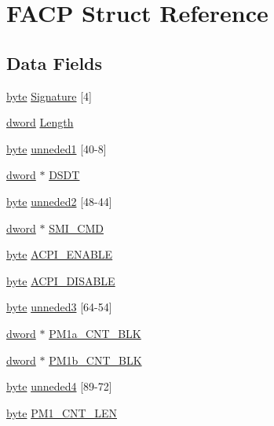 \hypertarget{structFACP}{}\section{F\+A\+CP Struct Reference}
\label{structFACP}
\subsection*{Data Fields}
\begin{DoxyCompactItemize}
\item 
\hyperlink{acpi_8c_a0c8186d9b9b7880309c27230bbb5e69d}{byte} \hyperlink{structFACP_a3ec5cc094770cdaf54942c95b5a4eae3}{Signature} \mbox{[}4\mbox{]}
\item 
\hyperlink{acpi_8c_a74cb93d430006e784da73b8ca406ee6e}{dword} \hyperlink{structFACP_ad27e676e94e75e3d8140a2a8c9fd6bfd}{Length}
\item 
\hyperlink{acpi_8c_a0c8186d9b9b7880309c27230bbb5e69d}{byte} \hyperlink{structFACP_ae5f7c21401a9d170e5c6a3caaa9b74ba}{unneded1} \mbox{[}40-\/8\mbox{]}
\item 
\hyperlink{acpi_8c_a74cb93d430006e784da73b8ca406ee6e}{dword} $\ast$ \hyperlink{structFACP_ae9d89be6ba26f7c9109d901c2daa3a75}{D\+S\+DT}
\item 
\hyperlink{acpi_8c_a0c8186d9b9b7880309c27230bbb5e69d}{byte} \hyperlink{structFACP_a6926f57eda7c9c85a3f7509b1d3080c6}{unneded2} \mbox{[}48-\/44\mbox{]}
\item 
\hyperlink{acpi_8c_a74cb93d430006e784da73b8ca406ee6e}{dword} $\ast$ \hyperlink{structFACP_a1ec5f1557834030b62601ecbf75eae9c}{S\+M\+I\+\_\+\+C\+MD}
\item 
\hyperlink{acpi_8c_a0c8186d9b9b7880309c27230bbb5e69d}{byte} \hyperlink{structFACP_a0ce6f514986cb7577fd80249528d4bf0}{A\+C\+P\+I\+\_\+\+E\+N\+A\+B\+LE}
\item 
\hyperlink{acpi_8c_a0c8186d9b9b7880309c27230bbb5e69d}{byte} \hyperlink{structFACP_ac7a25cb3b147fd2824eee9c6fe06f2e3}{A\+C\+P\+I\+\_\+\+D\+I\+S\+A\+B\+LE}
\item 
\hyperlink{acpi_8c_a0c8186d9b9b7880309c27230bbb5e69d}{byte} \hyperlink{structFACP_aa83604b4fb4ca7634fc6da593f8a9d10}{unneded3} \mbox{[}64-\/54\mbox{]}
\item 
\hyperlink{acpi_8c_a74cb93d430006e784da73b8ca406ee6e}{dword} $\ast$ \hyperlink{structFACP_a60341d35abc5ca9a85e97ec88f2afa0c}{P\+M1a\+\_\+\+C\+N\+T\+\_\+\+B\+LK}
\item 
\hyperlink{acpi_8c_a74cb93d430006e784da73b8ca406ee6e}{dword} $\ast$ \hyperlink{structFACP_a3f6c4a12d7aaa5b666230cb71d694e5b}{P\+M1b\+\_\+\+C\+N\+T\+\_\+\+B\+LK}
\item 
\hyperlink{acpi_8c_a0c8186d9b9b7880309c27230bbb5e69d}{byte} \hyperlink{structFACP_a8309a4015441febd7eebf3ed7524c2e7}{unneded4} \mbox{[}89-\/72\mbox{]}
\item 
\hyperlink{acpi_8c_a0c8186d9b9b7880309c27230bbb5e69d}{byte} \hyperlink{structFACP_aef6c96d35d4c773fb1e06e9baacd2a5f}{P\+M1\+\_\+\+C\+N\+T\+\_\+\+L\+EN}
\end{DoxyCompactItemize}



